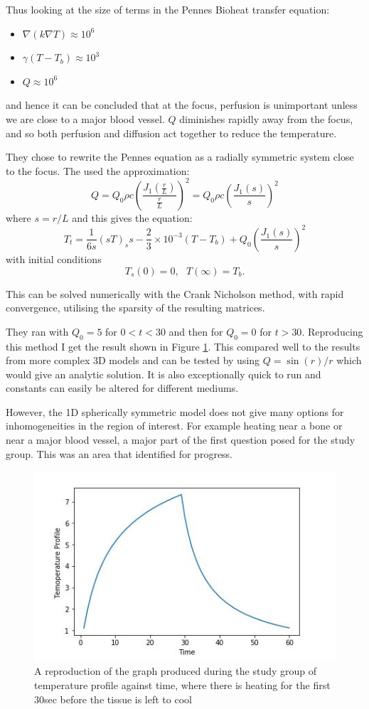 \documentclass[11pt]{article} %
\begin{document}
 	Thus looking at the size of terms in the Pennes Bioheat transfer equation:
 	\begin{itemize}
 		\item $\nabla (k\nabla T) \approx 10^6$
 		\item $ \gamma (T-T_b) \approx 10^3$
 		\item $ Q \approx 10^6$
 	\end{itemize}
 and hence it can be concluded that at the focus, perfusion is unimportant unless we are close to a major blood vessel.  $ Q $ diminishes rapidly away from the focus, and so both perfusion and diffusion act together to reduce the temperature. 
 
 They chose to rewrite the Pennes equation as a radially symmetric system close to the focus. The used the approximation: 
 \begin{equation}
 Q=Q_0 \rho c \left(\frac{J_1\left(\frac{r}{L}\right)}{\frac{r}{L}}\right)^2= Q_0\rho c \left(\frac{J_1(s)}{s}\right)^2
 \end{equation}
 where $s=r/L$ and this gives the equation:
 \begin{equation}
 T_t=\frac{1}{6s}(sT)_ss-\frac{2}{3}\times 10^{-3}(T-T_b)+Q_0 \left(\frac{J_1(s)}{s}\right)^2
 \end{equation}
 with initial conditions $$ T_s(0)=0 , \ \ \ T(\infty)=T_b .$$
 
 This can be solved numerically with the Crank Nicholson method, with rapid convergence,  utilising the sparsity of the resulting matrices. 
 
 They ran with $Q_0=5$ for $0<t<30$ and then for $Q_0=0$ for $t>30$. Reproducing this method I get the result shown in Figure   \ref{fig:studygroupcode}. This compared well to the results from more complex 3D models and can be tested by using $ Q=\sin(r)/r $ which would give an analytic solution. It is also exceptionally quick to run and constants can easily be altered for different mediums. 
 
 However, the 1D spherically symmetric model does not give many options for inhomogeneities in the region of interest. For example heating near a bone or near a major blood vessel, a major part of the first question posed for the study group. This was an area that identified for progress. 
 \begin{figure}
 	\centering
 	\includegraphics[width=0.7\linewidth]{Report_images/studygroupcode}
 	\caption{A reproduction of the graph produced during the study group of temperature profile against time, where there is heating for the first 30sec before the tissue is left to cool}
 	\label{fig:studygroupcode}
 \end{figure}
\end{document}
